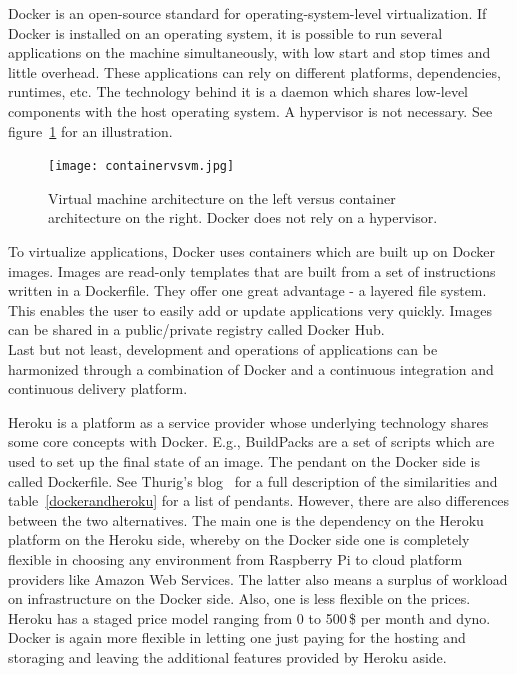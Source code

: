 Docker is an open-source standard for operating-system-level virtualization. If Docker is installed on an operating system, it is possible to run several applications on the machine simultaneously, with low start and stop times and little overhead. These applications can rely on different platforms, dependencies, runtimes, etc. The technology behind it is a daemon which shares low-level components with the host operating system. A hypervisor is not necessary. See figure~\ref{container} for an illustration. 

\begin{figure}[ht]
	\centering
  \texttt{[image: containervsvm.jpg]}
	\caption[Docker vs Virtual Machine Architecture]{Virtual machine architecture on the left versus container architecture on the right. Docker does not rely on a hypervisor.~\cite{Wurbs2017Docker2018.}}
	\label{container}
\end{figure}

To virtualize applications, Docker uses containers which are built up on Docker images. Images are read-only templates that are built from a set of instructions written in a Dockerfile. They offer one great advantage - a layered file system. This enables the user to easily add or update applications very quickly. Images can be shared in a public/private registry called Docker Hub. \\
Last but not least, development and operations of applications can be harmonized through a combination of Docker and a continuous integration and continuous delivery platform. 

Heroku is a platform as a service provider whose underlying technology shares some core concepts with Docker. E.g., BuildPacks are a set of scripts which are used to set up the final state of an image. The pendant on the Docker side is called Dockerfile. See Thurig's blog~\cite{Thurig2014Docker2018} for a full description of the similarities and table~\ref{dockerandheroku} for a list of pendants. However, there are also differences between the two alternatives. The main one is the dependency on the Heroku platform on the Heroku side, whereby on the Docker side one is completely flexible in choosing any environment from Raspberry Pi to cloud platform providers like Amazon Web Services. The latter also means a surplus of workload on infrastructure on the Docker side. Also, one is less flexible on the prices. Heroku has a staged price model ranging from 0 to 500\,\$ per month and dyno. Docker is again more flexible in letting one just paying for the hosting and storaging and leaving the additional features provided by Heroku aside.~\cite{Chris2017Why2018} 


